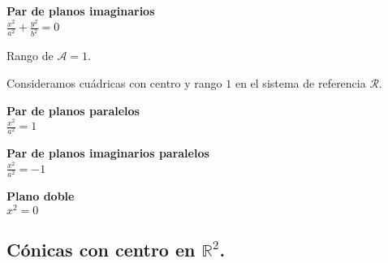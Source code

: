 \begin{minipage}[c]{0.45\textwidth}
  {\bf Par de planos imaginarios}\vspace{1em}\\
  $\displaystyle \frac{{x}^2}{a^2} + \frac{{y}^2}{b^2}=0$
\end{minipage}\hfill\vspace{1em}
\begin{minipage}[]{0.45\textwidth}
\hfill
\end{minipage}

\vspace{1em}

Rango de $\mathcal A = 1$.

Consideramos cuádricas con centro y rango $1$ en el sistema de referencia $\mathcal R$.

\vspace{1em}

\begin{minipage}[c]{0.45\textwidth}
  {\bf Par de planos paralelos}\vspace{1em}\\
  $\displaystyle \frac{{x}^2}{a^2}=1$
\end{minipage}\hfill\vspace{1em}
\begin{minipage}[]{0.45\textwidth}
\hfill
\end{minipage}

\begin{minipage}[c]{0.45\textwidth}
  {\bf Par de planos imaginarios paralelos}\vspace{1em}\\
  $\displaystyle \frac{{x}^2}{a^2} =-1$
\end{minipage}\hfill\vspace{1em}
\begin{minipage}[]{0.45\textwidth}
\hfill
\end{minipage}

\begin{minipage}[c]{0.45\textwidth}
  {\bf Plano doble}\vspace{1em}\\
  $\displaystyle {{x}^2} = 0$
\end{minipage}\hfill\vspace{1em}
\begin{minipage}[]{0.45\textwidth}
\hfill
\end{minipage}


\subsection{\bf  C\'onicas con centro en $\mathbb{R}^2$.}


